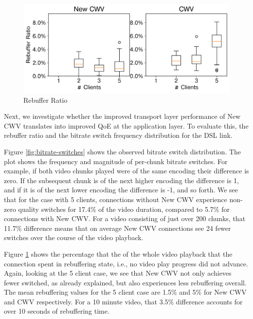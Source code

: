 \documentclass[10pt,sigconf,anonymous]{acmart}
\newcommand{\todo}[1]{\textbf{\textcolor{red}{To do: #1}}}
\begin{document}
\begin{figure}
      \includegraphics[width=.45\textwidth, keepaspectratio]{figures/Rebuffer_Ratio.pdf}
    \caption{Rebuffer Ratio}
    \label{fig:rebuffer-ratio}
\end{figure}



Next, we investigate whether the improved transport layer performance of New CWV translates into improved QoE at the application layer. To evaluate this, the rebuffer ratio and the bitrate switch frequency distribution for the DSL link. 


Figure \ref{fig:bitrate-switches} shows the observed bitrate switch distribution. The plot shows the frequency and magnitude of per-chunk bitrate switches. For example, if both video chunks played were of the same encoding their difference is zero. If the subsequent chunk is of the next higher encoding the difference is 1, and if it is of the next lower encoding the difference is -1, and so forth. We see that for the case with 5 clients, connections without New CWV experience non-zero quality switches for 17.4\% of the video duration, compared to 5.7\% for connections with New CWV. For a video consisting of just over 200 chunks, that 11.7\% difference means that on average New CWV connections see 24 fewer switches over the course of the video playback.

Figure \ref{fig:rebuffer-ratio} shows the percentage that the of the whole video playback that the connection spent in rebuffering state, i.e., no video play progress did not advance. Again, looking at the 5 client case, we see that New CWV not only achieves fewer switched, as already explained, but also experiences less rebuffering overall. The mean rebuffering values for the 5 client case are 1.5\% and 5\% for New CWV and CWV respectively. For a 10 minute video, that 3.5\% difference accounts for over 10 seconds of rebuffering time.
\end{document}
